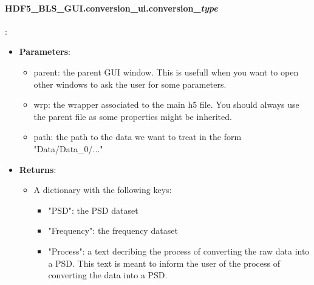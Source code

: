\begin{tcolorbox}
    \paragraph{HDF5\_BLS\_GUI.conversion\_ui.conversion\_\textit{type}}:
    \begin{itemize}
        \item \textbf{Parameters}:
        \begin{itemize}
            \item parent: the parent GUI window. This is usefull when you want to open other windows to ask the user for some parameters.
            \item wrp: the wrapper associated to the main h5 file. You should always use the parent file as some properties might be inherited.
            \item path: the path to the data we want to treat in the form "Data/Data\_0/..."
        \end{itemize} 
        \item \textbf{Returns}:
        \begin{itemize}
            \item A dictionary with the following keys:
            \begin{itemize}
                \item "PSD": the PSD dataset
                \item "Frequency": the frequency dataset
                \item "Process": a text decribing the process of converting the raw data into a PSD. This text is meant to inform the user of the process of converting the data into a PSD.
            \end{itemize}
        \end{itemize} 
    \end{itemize}
\end{tcolorbox}

